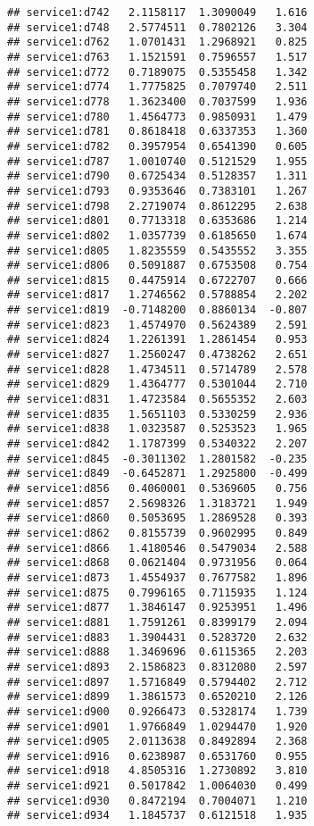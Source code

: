 \documentclass[
]{article}
\begin{document}
\begin{verbatim}
## service1:d742   2.1158117  1.3090049   1.616
## service1:d748   2.5774511  0.7802126   3.304
## service1:d762   1.0701431  1.2968921   0.825
## service1:d763   1.1521591  0.7596557   1.517
## service1:d772   0.7189075  0.5355458   1.342
## service1:d774   1.7775825  0.7079740   2.511
## service1:d778   1.3623400  0.7037599   1.936
## service1:d780   1.4564773  0.9850931   1.479
## service1:d781   0.8618418  0.6337353   1.360
## service1:d782   0.3957954  0.6541390   0.605
## service1:d787   1.0010740  0.5121529   1.955
## service1:d790   0.6725434  0.5128357   1.311
## service1:d793   0.9353646  0.7383101   1.267
## service1:d798   2.2719074  0.8612295   2.638
## service1:d801   0.7713318  0.6353686   1.214
## service1:d802   1.0357739  0.6185650   1.674
## service1:d805   1.8235559  0.5435552   3.355
## service1:d806   0.5091887  0.6753508   0.754
## service1:d815   0.4475914  0.6722707   0.666
## service1:d817   1.2746562  0.5788854   2.202
## service1:d819  -0.7148200  0.8860134  -0.807
## service1:d823   1.4574970  0.5624389   2.591
## service1:d824   1.2261391  1.2861454   0.953
## service1:d827   1.2560247  0.4738262   2.651
## service1:d828   1.4734511  0.5714789   2.578
## service1:d829   1.4364777  0.5301044   2.710
## service1:d831   1.4723584  0.5655352   2.603
## service1:d835   1.5651103  0.5330259   2.936
## service1:d838   1.0323587  0.5253523   1.965
## service1:d842   1.1787399  0.5340322   2.207
## service1:d845  -0.3011302  1.2801582  -0.235
## service1:d849  -0.6452871  1.2925800  -0.499
## service1:d856   0.4060001  0.5369605   0.756
## service1:d857   2.5698326  1.3183721   1.949
## service1:d860   0.5053695  1.2869528   0.393
## service1:d862   0.8155739  0.9602995   0.849
## service1:d866   1.4180546  0.5479034   2.588
## service1:d868   0.0621404  0.9731956   0.064
## service1:d873   1.4554937  0.7677582   1.896
## service1:d875   0.7996165  0.7115935   1.124
## service1:d877   1.3846147  0.9253951   1.496
## service1:d881   1.7591261  0.8399179   2.094
## service1:d883   1.3904431  0.5283720   2.632
## service1:d888   1.3469696  0.6115365   2.203
## service1:d893   2.1586823  0.8312080   2.597
## service1:d897   1.5716849  0.5794402   2.712
## service1:d899   1.3861573  0.6520210   2.126
## service1:d900   0.9266473  0.5328174   1.739
## service1:d901   1.9766849  1.0294470   1.920
## service1:d905   2.0113638  0.8492894   2.368
## service1:d916   0.6238987  0.6531760   0.955
## service1:d918   4.8505316  1.2730892   3.810
## service1:d921   0.5017842  1.0064030   0.499
## service1:d930   0.8472194  0.7004071   1.210
## service1:d934   1.1845737  0.6121518   1.935

\end{verbatim}
\end{document}
